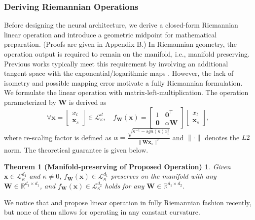 \subsubsection{\textbf{Deriving Riemannian Operations}}
Before designing the neural architecture, we derive a closed-form Riemannian linear operation and introduce a geometric midpoint for mathematical preparation. (Proofs are given in Appendix B.)
In Riemannian geometry, the operation output is required to remain on the manifold, i.e., manifold preserving.
Previous works typically meet this requirement by involving an additional tangent space with the exponential/logarithmic maps \cite{nips19hgcn,nips19hgnn}.
However, the lack of isometry and possible mapping error \cite{iclr23HyLa} motivate a fully Riemannian formulation.
We formulate the linear operation with matrix-left-multiplication. 
The operation parameterized by $\boldsymbol W$ is derived as 
\begin{equation}
\forall \boldsymbol x = \left[\begin{array}{c}
x_t \\
\boldsymbol x_s
\end{array}\right] \in \mathcal L_{\kappa }^{d},  \quad
f_{\boldsymbol W}(\boldsymbol x)=
\left[\begin{array}{cc}
1 & \mathbf{0}^{\top} \\
\mathbf{0} & \alpha \boldsymbol W
\end{array}\right]
\left[\begin{array}{c}
x_t \\
\boldsymbol x_s
\end{array}\right],
\end{equation}
where re-scaling factor is defined as $\alpha=\frac{\sqrt{\kappa^{-1}-sgn(\kappa)x^2_t}}{\|\boldsymbol W\boldsymbol x_s\|^2}$ and $\| \cdot \|$ denotes the $L2$ norm.
The theoretical guarantee is given below.
 \begin{mymath}
\newtheorem*{thm1}{Theorem 1 (Manifold-preserving of Proposed Operation)} 
\begin{thm1}
Given $\boldsymbol x \in \mathcal L_{\kappa }^{d_1}$ and $\kappa \neq 0$,  
$f_{\boldsymbol W}(\boldsymbol x) \in \mathcal L_{\kappa }^{d_1}$ preserves on the manifold with  any $\boldsymbol W \in \mathbb R^{{d_1}\times{d_1}}$, and 
$f_{\boldsymbol W}(\boldsymbol x) \in \mathcal L_{\kappa }^{d_2}$ holds for any $\boldsymbol W \in \mathbb R^{{d_1}\times{d_2}}$.
\end{thm1}
\end{mymath}
\noindent We notice that \citet{acl22fullyHyper} and \citet{kdd24Hypformer} propose linear operation in fully Riemannian fashion recently, but none of them allows for operating in  any constant curvature.
